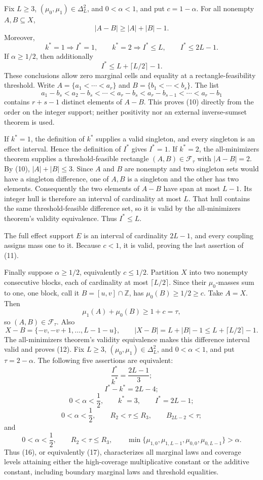 Fix \(L\geq 3\), \((\mu_0,\mu_1)\in\Delta_L^2\), and \(0<\alpha<1\), and put \(c=1-\alpha\).  For all nonempty \(A,B\subseteq X\),
\[
 |A-B|\geq |A|+|B|-1. \tag{10}
\]
Moreover,
\[
 k^*=1\Longrightarrow I^*=1,
 \qquad
 k^*=2\Longrightarrow I^*\leq L,
 \qquad
 I^*\leq 2L-1. \tag{11}
\]
If \(\alpha\geq 1/2\), then additionally
\[
 I^*\leq L+\lceil L/2\rceil-1. \tag{12}
\]
These conclusions allow zero marginal cells and equality at a rectangle-feasibility threshold.
Write \(A=\{a_1<\cdots<a_r\}\) and \(B=\{b_1<\cdots<b_s\}\).  The list
\[
 a_1-b_s<a_2-b_s<\cdots<a_r-b_s<a_r-b_{s-1}<\cdots<a_r-b_1
\]
contains \(r+s-1\) distinct elements of \(A-B\).  This proves (10) directly from the order on the integer support; neither positivity nor an external inverse-sumset theorem is used.

If \(k^*=1\), the definition of \(k^*\) supplies a valid singleton, and every singleton is an effect interval.  Hence the definition of \(I^*\) gives \(I^*=1\).  If \(k^*=2\), the all-minimizers theorem supplies a threshold-feasible rectangle \((A,B)\in\mathcal F_\tau\) with \(|A-B|=2\).  By (10), \(|A|+|B|\leq3\).  Since \(A\) and \(B\) are nonempty and two singleton sets would have a singleton difference, one of \(A,B\) is a singleton and the other has two elements.  Consequently the two elements of \(A-B\) have span at most \(L-1\).  Its integer hull is therefore an interval of cardinality at most \(L\).  That hull contains the same threshold-feasible difference set, so it is valid by the all-minimizers theorem's validity equivalence.  Thus \(I^*\leq L\).

The full effect support \(E\) is an interval of cardinality \(2L-1\), and every coupling assigns mass one to it.  Because \(c<1\), it is valid, proving the last assertion of (11).

Finally suppose \(\alpha\geq1/2\), equivalently \(c\leq1/2\).  Partition \(X\) into two nonempty consecutive blocks, each of cardinality at most \(\lceil L/2\rceil\).  Since their \(\mu_0\)-masses sum to one, one block, call it \(B=[u,v]\cap\mathbb Z\), has \(\mu_0(B)\geq1/2\geq c\).  Take \(A=X\).  Then
\[
 \mu_1(A)+\mu_0(B)\geq1+c=\tau,
\]
so \((A,B)\in\mathcal F_\tau\).  Also
\[
 X-B=\{-v,-v+1,\ldots,L-1-u\},
 \qquad
 |X-B|=L+|B|-1\leq L+\lceil L/2\rceil-1.
\]
The all-minimizers theorem's validity equivalence makes this difference interval valid and proves (12).
Fix \(L\geq3\), \((\mu_0,\mu_1)\in\Delta_L^2\), and \(0<\alpha<1\), and put \(\tau=2-\alpha\).  The following five assertions are equivalent:
\[
 \frac{I^*}{k^*}=\frac{2L-1}{3}; \tag{13}
\]
\[
 I^*-k^*=2L-4; \tag{14}
\]
\[
 0<\alpha<\frac12,\qquad k^*=3,\qquad I^*=2L-1; \tag{15}
\]
\[
 0<\alpha<\frac12,\qquad R_2<\tau\leq R_3,
 \qquad B_{2L-2}<\tau; \tag{16}
\]
and
\[
 0<\alpha<\frac12,\qquad R_2<\tau\leq R_3,
 \qquad
 \min\{\mu_{1,0},\mu_{1,L-1},\mu_{0,0},\mu_{0,L-1}\}>\alpha. \tag{17}
\]
Thus (16), or equivalently (17), characterizes all marginal laws and coverage levels attaining either the high-coverage multiplicative constant or the additive constant, including boundary marginal laws and threshold equalities.

